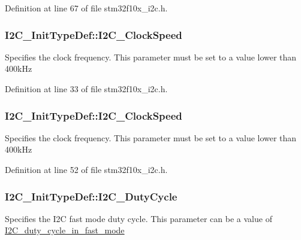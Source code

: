 Definition at line 67 of file stm32f10x\+\_\+i2c.\+h.

\subsubsection[{\texorpdfstring{I2\+C\+\_\+\+Clock\+Speed}{I2C_ClockSpeed}}]{ I2\+C\+\_\+\+Init\+Type\+Def\+::\+I2\+C\+\_\+\+Clock\+Speed}\hypertarget{struct_i2_c___init_type_def_a662c9f2c1d94730213ab952a8be1974a}{}\label{struct_i2_c___init_type_def_a662c9f2c1d94730213ab952a8be1974a}
Specifies the clock frequency. This parameter must be set to a value lower than 400k\+Hz 

Definition at line 33 of file stm32f10x\+\_\+i2c.\+h.

\subsubsection[{\texorpdfstring{I2\+C\+\_\+\+Clock\+Speed}{I2C_ClockSpeed}}]{ I2\+C\+\_\+\+Init\+Type\+Def\+::\+I2\+C\+\_\+\+Clock\+Speed}\hypertarget{struct_i2_c___init_type_def_a737c289f4515ae4cb642db0412762169}{}\label{struct_i2_c___init_type_def_a737c289f4515ae4cb642db0412762169}
Specifies the clock frequency. This parameter must be set to a value lower than 400k\+Hz 

Definition at line 52 of file stm32f10x\+\_\+i2c.\+h.

\subsubsection[{\texorpdfstring{I2\+C\+\_\+\+Duty\+Cycle}{I2C_DutyCycle}}]{ I2\+C\+\_\+\+Init\+Type\+Def\+::\+I2\+C\+\_\+\+Duty\+Cycle}\hypertarget{struct_i2_c___init_type_def_aec48bda7cf5ba2772f11e9d6161b8005}{}\label{struct_i2_c___init_type_def_aec48bda7cf5ba2772f11e9d6161b8005}
Specifies the I2C fast mode duty cycle. This parameter can be a value of \hyperlink{group___i2_c__duty__cycle__in__fast__mode}{I2\+C\+\_\+duty\+\_\+cycle\+\_\+in\+\_\+fast\+\_\+mode} 


